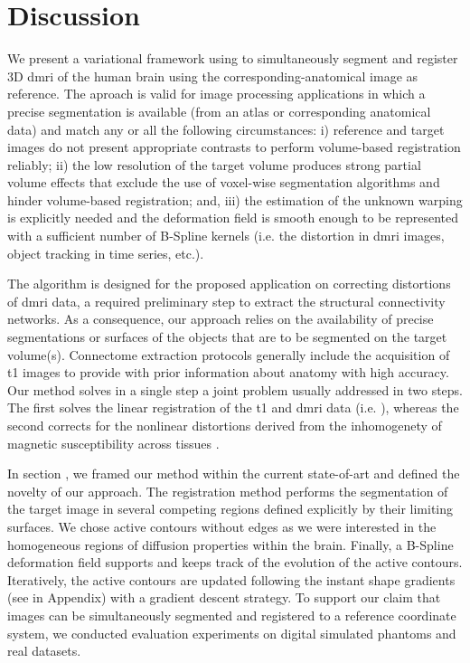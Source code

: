 \section*{Discussion}
\label{sec:discussion}
We present a variational framework using to simultaneously segment and
  register 3D \gls*{dmri} of the human brain using the corresponding-anatomical image
  as reference.
The aproach is valid for image processing applications in which a precise segmentation is
  available (from an atlas or corresponding anatomical data) and match any or all
  the following circumstances:
  i) reference and target images do not present appropriate contrasts to
  	perform volume-based registration reliably;
  ii) the low resolution of the target volume produces strong partial volume effects
  	that exclude the use of voxel-wise segmentation algorithms and hinder volume-based
  	registration; and,
  iii) the estimation of the unknown warping is explicitly needed and the
    deformation field is smooth enough to be represented with a sufficient number
  	of B-Spline kernels (i.e. the distortion in \gls*{dmri} images,
  	object tracking in time series, etc.).

The algorithm is designed for the proposed application on correcting distortions of
  \gls*{dmri} data, a required preliminary step to extract the structural connectivity
  networks.
As a consequence, our approach relies on the availability of precise segmentations or
  surfaces of the objects that are to be segmented on the target volume(s).
Connectome extraction protocols generally include the acquisition of \gls*{t1} images
  to provide with prior information about anatomy with high accuracy.
Our method solves in a single step a joint problem usually addressed in two steps.
The first solves the linear registration of the \gls*{t1} and \gls*{dmri} data (i.e.
  \cite{greve_accurate_2009}), whereas the second corrects for the nonlinear distortions
  derived from the inhomogenety of magnetic susceptibility across tissues
  \citep{jezzard_correction_1995}.

In section , we framed our method within the current
  state-of-art and defined the novelty of our approach.
The registration method performs the segmentation of the target image in several
  competing regions defined explicitly by their limiting surfaces.
We chose active contours without edges as we were interested in the homogeneous
  regions of diffusion properties within the brain.
Finally, a B-Spline deformation field supports and keeps track of the evolution of the
  active contours.
Iteratively, the active contours are updated following the instant shape gradients
  (see  in Appendix) with a gradient descent strategy.
To support our claim that images can be simultaneously segmented and registered to a
  reference coordinate system, we conducted evaluation experiments on digital
  simulated phantoms and real datasets.


